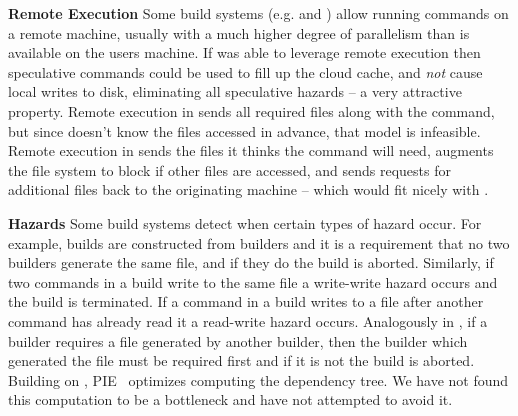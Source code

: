 \textbf{Remote Execution} Some build systems (e.g. \Bazel and \BuildXL \cite{buildxl}) allow running commands on a remote machine, usually with a much higher degree of parallelism than is available on the users machine. If \Rattle was able to leverage remote execution then speculative commands could be used to fill up the cloud cache, and \emph{not} cause local writes to disk, eliminating all speculative hazards -- a very attractive property. Remote execution in \Bazel sends all required files along with the command, but since \Rattle doesn't know the files accessed in advance, that model is infeasible. Remote execution in \BuildXL sends the files it thinks the command will need, augments the file system to block if other files are accessed, and sends requests for additional files back to the originating machine -- which would fit nicely with \Rattle.

\textbf{Hazards} Some build systems detect when certain types of hazard occur. For example, \Pluto \cite{erdweg2015sound} builds are constructed from builders and it is a requirement that no two builders generate the same file, and if they do the build is aborted. Similarly, if two commands in a \Rattle build write to the same file a write-write hazard occurs and the build is terminated. If a command in a \Rattle build writes to a file after another command has already read it a read-write hazard occurs. Analogously in \Pluto, if a builder requires a file generated by another builder, then the builder which generated the file must be required first and if it is not the build is aborted. Building on \Pluto, \textsc{PIE}~\cite{10.1145/3238147.3238196, Konat_2018} optimizes computing the dependency tree. We have not found this computation to be a bottleneck and have not attempted to avoid it.

%

